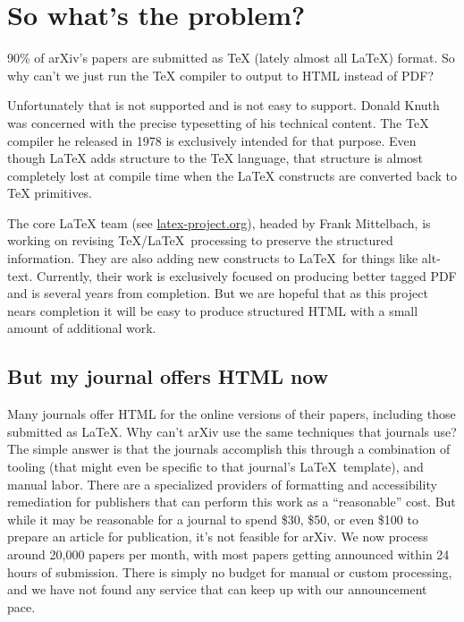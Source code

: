\documentclass{easychair}
\begin{document}
\section{So what’s the problem?}
\label{sect:So whats the problem?}

90\% of arXiv's papers are submitted as TeX (lately almost all LaTeX) format. So why can't we just run the TeX compiler to output to HTML instead of PDF?

Unfortunately that is not supported and is not easy to support. Donald Knuth was concerned with the precise typesetting of his technical content. The TeX compiler he released in 1978 is exclusively intended for that purpose. Even though LaTeX adds structure to the TeX language, that structure is almost completely lost at compile time when the LaTeX constructs are converted back to TeX primitives. 

The core LaTeX team (see \href{https://www.latex-project.org/latex3/}{latex-project.org}), headed by Frank Mittelbach, is working on revising \TeX/\LaTeX\ processing to preserve the structured information. They are also adding new constructs to \LaTeX\ for things like alt-text. Currently, their work is exclusively focused on producing better tagged PDF and is several years from completion. But we are hopeful that as this project nears completion it will be easy to produce structured HTML with a small amount of additional work.

\subsection{But my journal offers HTML now}
\label{sect:But my journal offers HTML now}

Many journals offer HTML for the online versions of their papers, including those submitted as \LaTeX. Why can't arXiv use the same techniques that journals use? The simple answer is that the journals accomplish this through a combination of tooling (that might even be specific to that journal's \LaTeX\ template), and manual labor. There are a specialized providers of formatting and accessibility remediation for publishers that can perform this work as a ``reasonable'' cost. But while it may be reasonable for a journal to spend \$30, \$50, or even \$100 to prepare an article for publication, it's not feasible for arXiv. We now process around 20,000 papers per month, with most papers getting announced within 24 hours of submission. There is simply no budget for manual or custom processing, and we have not found any service that can keep up with our announcement pace.
\end{document}
